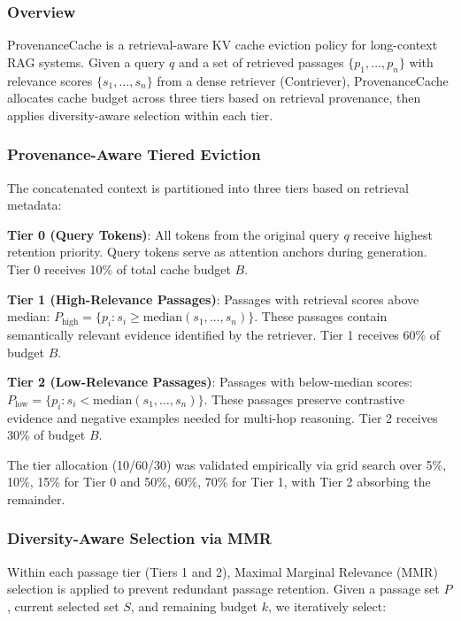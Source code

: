 
\subsubsection{Overview}

ProvenanceCache is a retrieval-aware KV cache eviction policy for long-context RAG systems. Given a query $q$ and a set of retrieved passages $\{p_1, \ldots, p_n\}$ with relevance scores $\{s_1, \ldots, s_n\}$ from a dense retriever (Contriever), ProvenanceCache allocates cache budget across three tiers based on retrieval provenance, then applies diversity-aware selection within each tier.

\subsubsection{Provenance-Aware Tiered Eviction}

The concatenated context is partitioned into three tiers based on retrieval metadata:

\textbf{Tier 0 (Query Tokens)}: All tokens from the original query $q$ receive highest retention priority. Query tokens serve as attention anchors during generation. Tier 0 receives 10\% of total cache budget $B$.

\textbf{Tier 1 (High-Relevance Passages)}: Passages with retrieval scores above median: $P_{\text{high}} = \{p_i : s_i \geq \text{median}(s_1, \ldots, s_n)\}$. These passages contain semantically relevant evidence identified by the retriever. Tier 1 receives 60\% of budget $B$.

\textbf{Tier 2 (Low-Relevance Passages)}: Passages with below-median scores: $P_{\text{low}} = \{p_i : s_i < \text{median}(s_1, \ldots, s_n)\}$. These passages preserve contrastive evidence and negative examples needed for multi-hop reasoning. Tier 2 receives 30\% of budget $B$.

The tier allocation (10/60/30) was validated empirically via grid search over {5\%, 10\%, 15\%} for Tier 0 and {50\%, 60\%, 70\%} for Tier 1, with Tier 2 absorbing the remainder.

\subsubsection{Diversity-Aware Selection via MMR}

Within each passage tier (Tiers 1 and 2), Maximal Marginal Relevance (MMR) selection is applied to prevent redundant passage retention. Given a passage set $P$, current selected set $S$, and remaining budget $k$, we iteratively select:


